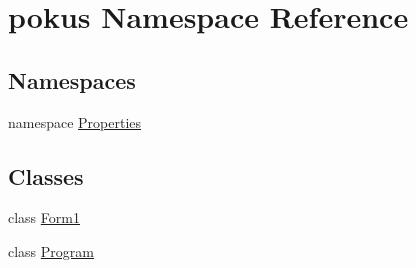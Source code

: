 \hypertarget{namespacepokus}{}\section{pokus Namespace Reference}
\label{namespacepokus}
\subsection*{Namespaces}
\begin{DoxyCompactItemize}
\item 
namespace \hyperlink{namespacepokus_1_1Properties}{Properties}
\end{DoxyCompactItemize}
\subsection*{Classes}
\begin{DoxyCompactItemize}
\item 
class \hyperlink{classpokus_1_1Form1}{Form1}
\item 
class \hyperlink{classpokus_1_1Program}{Program}
\end{DoxyCompactItemize}

